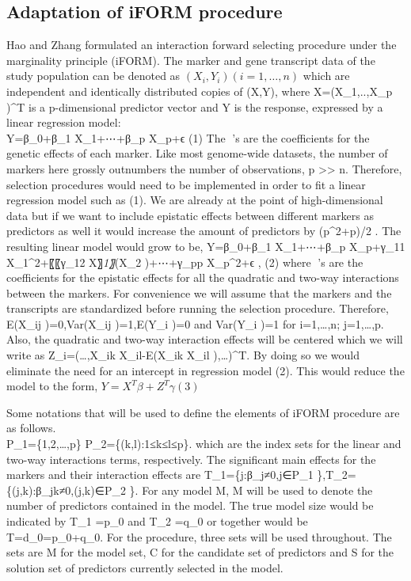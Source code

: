 \documentclass[]{book}
\theoremstyle{definition}
\theoremstyle{definition}
\theoremstyle{remark}
\begin{document}
\subsection{Adaptation of iFORM
procedure}\label{adaptation-of-iform-procedure}

Hao and Zhang \cite{hao2014interaction} formulated an interaction
forward selecting procedure under the marginality principle (iFORM). The
marker and gene transcript data of the study population can be denoted
as \((X_i,Y_i) (i = 1, …, n)\) which are independent and identically
distributed copies of (X,Y), where X=(X\_1,..,X\_p )\^{}T is a
p-dimensional predictor vector and Y is the response, expressed by a
linear regression model:\\
Y=β\_0+β\_1 X\_1+⋯+β\_p X\_p+ϵ (1) The 's are the coefficients for the
genetic effects of each marker. Like most genome-wide datasets, the
number of markers here grossly outnumbers the number of observations, p
\textgreater{}\textgreater{} n. Therefore, selection procedures would
need to be implemented in order to fit a linear regression model such as
(1). We are already at the point of high-dimensional data but if we want
to include epistatic effects between different markers as predictors as
well it would increase the amount of predictors by (p\^{}2+p)/2 . The
resulting linear model would grow to be, Y=β\_0+β\_1 X\_1+⋯+β\_p
X\_p+γ\_11 X\_1\^{}2+〖〖γ\_12 X〗\emph{1〗}(X\_2 )+⋯+γ\_pp X\_p\^{}2+ϵ
, (2) where 's are the coefficients for the epistatic effects for all
the quadratic and two-way interactions between the markers. For
convenience we will assume that the markers and the transcripts are
standardized before running the selection procedure. Therefore, E(X\_ij
)=0,Var(X\_ij )=1,E(Y\_i )=0 and Var(Y\_i )=1 for i=1,\ldots{},n;
j=1,\ldots{},p. Also, the quadratic and two-way interaction effects will
be centered which we will write as Z\_i=(\ldots{},X\_ik X\_il-E(X\_ik
X\_il ),\ldots{})\^{}T. By doing so we would eliminate the need for an
intercept in regression model (2). This would reduce the model to the
form, \(Y=X^T β+Z^T γ (3)\)

Some notations that will be used to define the elements of
\cite{hao2014interaction} iFORM procedure are as follows.\\
P\_1=\{1,2,\ldots{},p\} P\_2=\{(k,l):1≤k≤l≤p\}. which are the index sets
for the linear and two-way interactions terms, respectively. The
significant main effects for the markers and their interaction effects
are T\_1=\{j:β\_j≠0,j∈P\_1 \},T\_2=\{(j,k):β\_jk≠0,(j,k)∈P\_2 \}. For
any model M, \textbar{}M\textbar{} will be used to denote the number of
predictors contained in the model. The true model size would be
indicated by \textbar{}T\_1 \textbar{}=p\_0 and \textbar{}T\_2
\textbar{}=q\_0 or together would be
\textbar{}T\textbar{}=d\_0=p\_0+q\_0. For the procedure, three sets will
be used throughout. The sets are M for the model set, C for the
candidate set of predictors and S for the solution set of predictors
currently selected in the model.
\end{document}
